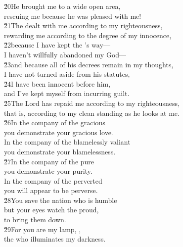 \begin{poetry}
\poeml \v{20}He brought me to a wide open area, \\
\poemll    rescuing me because he was pleased with me! \\
\poeml \v{21}The  dealt with me according to my righteousness, \\
\poemll    rewarding me according to the degree of my innocence, \\
\poeml \v{22}because I have kept the 's way--- \\
\poemll    I haven't willfully abandoned my God--- \\
\poeml \v{23}and because all of his decrees remain in my thoughts, \\
\poemll    I have not turned aside from his statutes, \\
\poeml \v{24}I have been innocent before him, \\
\poemll    and I've kept myself from incurring guilt. \\
\poeml \v{25}The Lord has repaid me according to my righteousness, \\
\poemll    that is, according to my clean standing as he looks at me. \\
\poeml \v{26}In the company of the gracious \\
\poemll    you demonstrate your gracious love. \\
\poeml In the company of the blamelessly valiant \\
\poemll    you demonstrate your blamelessness. \\
\poeml \v{27}In the company of the pure \\
\poemll    you demonstrate your purity. \\
\poeml In the company of the perverted \\
\poemll    you will appear to be perverse. \\
\poeml \v{28}You save the nation who is humble \\
\poemll    but your eyes watch the proud, \\
\poemlll       to bring them down. \\
\poeml \v{29}For you are my lamp, , \\
\poemll    the  who illuminates my darkness. \\

\end{poetry}
